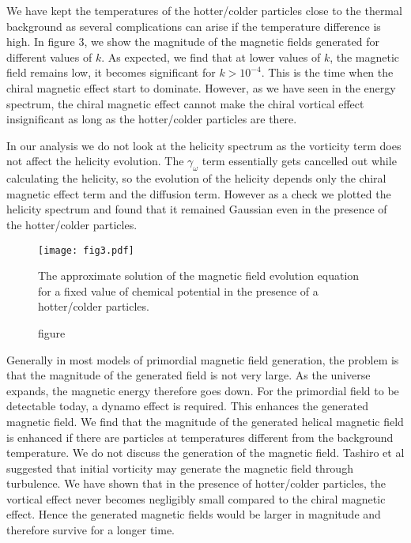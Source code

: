 \documentclass{ws-mpla}
\begin{document}
We have kept the 
temperatures of the hotter/colder particles close to the thermal background as several complications can arise if the temperature difference is high. In figure 3, 
we show the magnitude of the magnetic fields generated for different values of $k$. As expected, we find that at 
lower values of $k$, the magnetic field remains low, it becomes significant for $k > 10^{-4}$. This is the time when the chiral magnetic effect start to dominate.
However, as we have seen in the energy spectrum, the chiral magnetic effect cannot make the chiral vortical effect insignificant as long as the hotter/colder particles 
are there. 

In our analysis we do not look at the helicity spectrum as the vorticity term does not affect the helicity evolution.  
 The $\gamma_\omega$ term essentially gets cancelled out while calculating the helicity, so the evolution of the helicity depends only the chiral magnetic effect term 
 and the diffusion term. However as a check we plotted the helicity spectrum and found that it remained Gaussian even in the presence of the hotter/colder particles. 
\begin{figure}
\begin{center}
	\texttt{[image: fig3.pdf]}
	\caption{figure}{The approximate solution of the magnetic field evolution equation for a fixed value of chemical potential in the presence of a hotter/colder particles.} 
\end{center}
\end{figure}


Generally in most models of primordial magnetic field generation, the problem is that the magnitude of the generated field is not very large. As the universe expands, 
the magnetic energy therefore goes down. For the primordial field to be detectable today, a dynamo effect is required. This enhances the generated magnetic field.
We find that the magnitude of the generated helical magnetic field is enhanced if there are particles at temperatures different from the background temperature. 
We do not discuss the generation 
of the magnetic field. Tashiro et al \cite{tashiro} suggested that initial vorticity may generate the magnetic field through turbulence. We have shown that in the presence of 
hotter/colder particles, the vortical effect never becomes negligibly small compared to the chiral magnetic effect. Hence the generated magnetic fields would 
be larger in magnitude and therefore survive for a longer time. 
\end{document}
